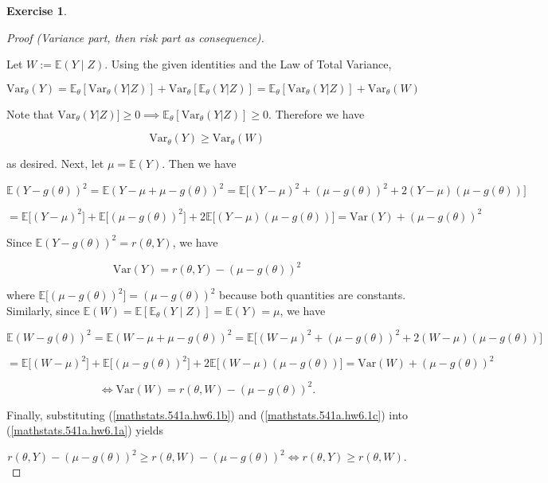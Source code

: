 \documentclass{article}
\theoremstyle{definition}
\newtheorem{exercise}{Exercise}
\theoremstyle{definition}
\theoremstyle{definition}
\theoremstyle{definition}
\newcommand{\E}{\mathbb{E}}
\newcommand{\Var}{\mathrm{Var}}
\begin{document}
\begin{exercise}
\begin{proof}[Proof (Variance part, then risk part as consequence)]
 \
 
 Let \(W := \E(Y \mid Z)\). Using the given identities and the Law of Total Variance,

\[
\mathrm{Var}_{\theta}(Y) = \E_\theta[\mathrm{Var}_\theta(Y|Z)]+\mathrm{Var}_\theta[\E_\theta(Y|Z)]= \E_\theta[\mathrm{Var}_\theta(Y|Z)]+\mathrm{Var}_\theta(W)
\]


Note that \(\mathrm{Var}_\theta(Y|Z)] \geq 0 \implies \E_\theta[\mathrm{Var}_\theta(Y|Z)] \geq 0\). Therefore we have


\begin{equation}\label{mathstats.541a.hw6.1a}
\mathrm{Var}_{\theta}(Y) \geq \mathrm{Var}_\theta(W)
\end{equation}




as desired. Next, let \(\mu = \E(Y)\). Then we have

\[
\E(Y - g(\theta))^2 = \E(Y - \mu + \mu - g(\theta))^2 = \E\big[(Y- \mu)^2 + (\mu - g(\theta))^2 + 2 (Y - \mu)(\mu - g(\theta)) \big]
\]

\[
 = \E\big[(Y- \mu)^2 \big] + \E \big[ (\mu - g(\theta))^2 \big] + 2 \E \big[ (Y - \mu)(\mu - g(\theta)) \big]  = \Var(Y) + (\mu - g(\theta))^2 
\]

Since \( \E(Y - g(\theta))^2 = r(\theta, Y) \), we have

\begin{equation}\label{mathstats.541a.hw6.1b}
 \Var(Y) = r(\theta, Y)   - (\mu - g(\theta))^2 
\end{equation}

where \( \E \big[ (\mu - g(\theta))^2 \big] = (\mu - g(\theta))^2 \) because both quantities are constants. Similarly, since \(\E(W) = \E[\E_\theta (Y \mid Z)]  = \E(Y) = \mu\), we have

\[
\E(W - g(\theta))^2 = \E(W - \mu + \mu - g(\theta))^2 = \E\big[(W- \mu)^2 + (\mu - g(\theta))^2 + 2 (W - \mu)(\mu - g(\theta)) \big]
\]

\[
 = \E\big[(W- \mu)^2 \big] + \E \big[ (\mu - g(\theta))^2 \big] + 2 \E \big[ (W - \mu)(\mu - g(\theta)) \big]  = \Var(W) + (\mu - g(\theta))^2 
\]

\begin{equation}\label{mathstats.541a.hw6.1c}
\iff  \Var(W) = r(\theta, W)  - (\mu - g(\theta))^2 .
\end{equation}

Finally, substituting (\ref{mathstats.541a.hw6.1b}) and (\ref{mathstats.541a.hw6.1c}) into (\ref{mathstats.541a.hw6.1a}) yields

\[
r(\theta, Y)   - (\mu - g(\theta))^2 \geq r(\theta, W)  - (\mu - g(\theta))^2 \iff r(\theta, Y)  \geq  r(\theta, W).
\]


\end{proof}


\end{exercise}
\end{document}
